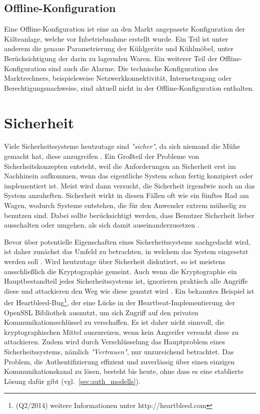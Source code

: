 \documentclass[11pt,a4paper]{report}
\begin{document}
\subsection{Offline-Konfiguration} 

Eine Offline-Konfiguration ist eine an den Markt angepasste Konfiguration der Kälteanlage, welche vor Inbetriebnahme erstellt wurde. Ein Teil ist unter anderem die genaue Parametrierung der Kühlgeräte und Kühlmöbel, unter Berücksichtigung der darin zu lagernden Waren. Ein weiterer Teil der Offline-Konfiguration sind auch die Alarme. Die technische Konfiguration des Marktrechners, beispielsweise Netzwerkkonnektivität, Internetzugang oder Berechtigungsnachweise, sind aktuell nicht in der Offline-Konfiguration enthalten.

\section{Sicherheit} \label{sec:security_conzept}

Viele Sicherheitssysteme heutzutage sind \textit{"sicher"}, da sich niemand die Mühe gemacht hat, diese anzugreifen \cite[s.~0]{gutmann}. Ein Großteil der Probleme von Sicherheitskonzepten entsteht, weil die Anforderungen an Sicherheit erst im Nachhinein aufkommen, wenn das eigentliche System schon fertig konzipiert oder implementiert ist. Meist wird dann versucht, die Sicherheit irgendwie noch an das System anzuheften. Sicherheit wirkt in diesen Fällen oft wie ein fünftes Rad am Wagen, wodurch Systeme entstehen, die für den Anwender extrem mühselig zu benutzen sind. Dabei sollte berücksichtigt werden, dass Benutzer Sicherheit lieber ausschalten oder umgehen, als sich damit auseinanderzusetzen \cite[s.~5]{gutmann}. 

Bevor über potentielle Eigenschaften eines Sicherheitssystems nachgedacht wird, ist daher zunächst das Umfeld zu betrachten, in welchem das System eingesetzt werden soll \cite[s.~4]{gutmann}. Wird heutzutage über Sicherheit diskutiert, so ist meistens ausschließlich die Kryptographie gemeint. Auch wenn die Kryptographie ein Hauptbestandteil jedes Sicherheitssystems ist, ignorieren praktisch alle Angriffe diese und attackieren den Weg wie diese genutzt wird \cite[s.~1]{gutmann}. Ein bekanntes Beispiel ist der Heartbleed-Bug\footnote{(Q2/2014) weitere Informationen unter http://heartbleed.com}, der eine Lücke in der Heartbeat-Implementierung der OpenSSL Bibliothek ausnutzt, um sich Zugriff auf den privaten Kommunikationsschlüssel zu verschaffen. Es ist daher nicht sinnvoll, die kryptographischen Mittel auszureizen, wenn kein Angreifer versucht diese zu attackieren. Zudem wird durch Verschlüsselung das Hauptproblem eines Sicherheitssystems, nämlich \textit{"Vertrauen"}, nur unzureichend betrachtet. Das Problem, die Authentifizierung effizient und zuverlässig über einen einzigen Kommunikationskanal zu lösen, besteht bis heute, ohne dass es eine etablierte Lösung dafür gibt (vgl.~\ref{sec:auth_modells}). 
\end{document}
